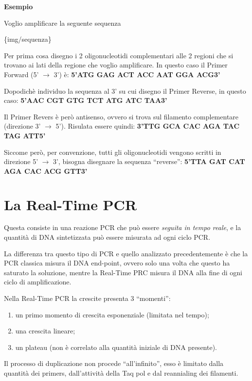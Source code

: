 \documentclass[11pt]{book}
\begin{document}
\textbf{Esempio}

Voglio amplificare la seguente sequenza

\{img/sequenza\}

Per prima cosa disegno i 2 oligonucleotidi complementari alle 2 regioni
che si trovano ai lati della regione che voglio amplificare. In questo
caso il Primer Forward (5' \(\rightarrow\) 3') è: \textbf{5'ATG GAG ACT
ACC AAT GGA ACG3'}

Dopodichè individuo la sequenza al 3' su cui disegno il Primer Reverse,
in questo caso: \textbf{5'AAC CGT GTG TCT ATG ATC TAA3'}

Il Primer Revers è però antisenso, ovvero si trova sul filamento
complementare (direzione 3' \(\rightarrow\) 5'). Risulata essere quindi:
\textbf{3'TTG GCA CAC AGA TAC TAG ATT5'}

Siccome però, per convenzione, tutti gli oligonucleotidi vengono scritti
in direzione 5' \(\rightarrow\) 3', bisogna disegnare la sequenza
``reverse'': \textbf{5'TTA GAT CAT AGA CAC ACG GTT3'}

\section{La Real-Time PCR}\label{la-real-time-pcr}

Questa consiste in una reazione PCR che può essere \emph{seguita in
tempo reale}, e la quantità di DNA sintetizzata può essere misurata ad
ogni ciclo PCR.

La differenza tra questo tipo di PCR e quello analizzato precedentemente
è che la PCR classica misura il DNA end-point, ovvero solo una volta che
questo ha saturato la soluzione, mentre la Real-Time PRC misura il DNA
alla fine di ogni ciclo di amplificazione.

Nella Real-Time PCR la crescite presenta 3 ``momenti'':

\begin{enumerate}
\def\labelenumi{\arabic{enumi}.}
\itemsep1pt\parskip0pt
\item
  un primo momento di crescita esponenziale (limitata nel tempo);
\item
  una crescita lineare;
\item
  un plateau (non è correlato alla quantità iniziale di DNA presente).
\end{enumerate}

Il processo di duplicazione non procede ``all'infinito'', esso è
limitato dalla quantità dei primers, dall'attività della Taq pol e dal
reannialing dei filamenti.
\end{document}
